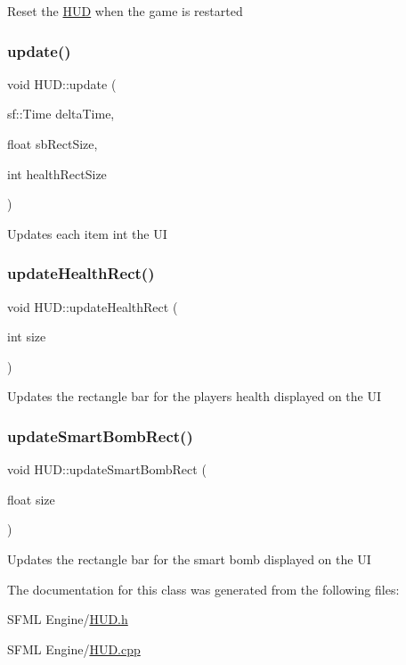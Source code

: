 Reset the \hyperlink{class_h_u_d}{H\+UD} when the game is restarted \mbox{\label{class_h_u_d_a82e0269135f98973429dc257bb1c7d5a}} 
\subsubsection{\texorpdfstring{update()}{update()}}
{\footnotesize\ttfamily void H\+U\+D\+::update (\begin{DoxyParamCaption}\item[{sf\+::\+Time}]{delta\+Time,  }\item[{float}]{sb\+Rect\+Size,  }\item[{int}]{health\+Rect\+Size }\end{DoxyParamCaption})}

Updates each item int the UI \mbox{\label{class_h_u_d_a6112a6edad58595a45c8f63f354615ee}} 
\subsubsection{\texorpdfstring{update\+Health\+Rect()}{updateHealthRect()}}
{\footnotesize\ttfamily void H\+U\+D\+::update\+Health\+Rect (\begin{DoxyParamCaption}\item[{int}]{size }\end{DoxyParamCaption})}

Updates the rectangle bar for the player\textquotesingle{}s health displayed on the UI \mbox{\label{class_h_u_d_a44b111c7f1f1c246203bd87f4ebff786}} 
\subsubsection{\texorpdfstring{update\+Smart\+Bomb\+Rect()}{updateSmartBombRect()}}
{\footnotesize\ttfamily void H\+U\+D\+::update\+Smart\+Bomb\+Rect (\begin{DoxyParamCaption}\item[{float}]{size }\end{DoxyParamCaption})}

Updates the rectangle bar for the smart bomb displayed on the UI 

The documentation for this class was generated from the following files\+:\begin{DoxyCompactItemize}
\item 
S\+F\+M\+L Engine/\hyperlink{_h_u_d_8h}{H\+U\+D.\+h}\item 
S\+F\+M\+L Engine/\hyperlink{_h_u_d_8cpp}{H\+U\+D.\+cpp}\end{DoxyCompactItemize}
